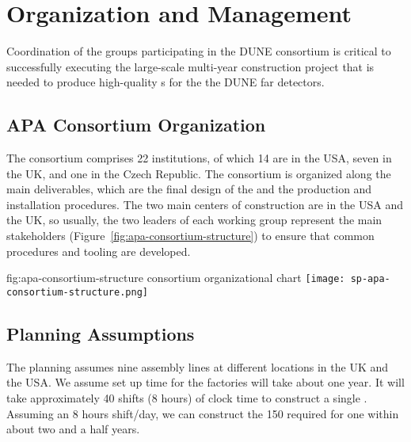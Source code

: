 \section{Organization and Management}
\label{sec:fdsp-apa-org}

Coordination of the groups participating in the DUNE  consortium is critical to successfully executing the large-scale multi-year construction project that is needed to produce high-quality s for the the DUNE far detectors.  


\subsection{APA Consortium Organization}
\label{sec:fdsp-apa-org-consortium}

The  consortium comprises \num{22} institutions, of which \num{14} are in the USA, seven in the UK, and one in the Czech Republic. The consortium is organized along the main deliverables, which are the final design of the  and the  production and installation procedures. The two main centers of  construction are in the USA and the UK, so usually, the two leaders of each working group represent the main stakeholders (Figure~\ref{fig:apa-consortium-structure}) to ensure that common procedures and tooling are developed. 

\begin{dunefigure}{fig:apa-consortium-structure}
{ consortium organizational chart}
\texttt{[image: sp-apa-consortium-structure.png]}
\end{dunefigure}


\subsection{Planning Assumptions}
\label{sec:fdsp-apa-org-assmp}

The planning assumes nine  assembly lines at different locations in the UK and the USA. 
We assume set up time for the factories will take about one year.
It will take approximately \num{40} shifts (8 hours) of clock time  to construct a single . Assuming an 8 hours shift/day, we can construct the \num{150}  required for one  %
within about two and a half years.

